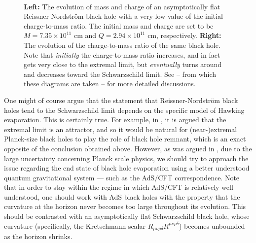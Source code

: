\documentclass[12pt]{article}
\newcommand{\2}{$^2$}
\newcommand{\3}{$^3$}
\newcommand{\4}{$_4$}
\newcommand{\5}{$_5$}
\begin{document}
\begin{figure}[!h]
\centering
\mbox{\quad
{}}
\caption{\textbf{Left:} The evolution of mass and charge of an asymptotically flat Reissner-Nordstr\"om black hole with a very low value of the initial charge-to-mass ratio. The initial mass and charge are set to be $M=7.35 \times 10^{11}$ cm and $Q=2.94 \times 10^{11}$ cm, respectively. \textbf{Right:} The evolution of the charge-to-mass ratio of the same black hole. Note that \emph{initially} the charge-to-mass ratio increases, and in fact gets very close to the extremal limit, but \emph{eventually} turns around and decreases toward the Schwarzschild limit. See \cite{OC} -- from which these diagrams are taken -- for more detailed discussions. \label{RNevol}}
\end{figure}


One might of course argue that the statement that Reissner-Nordstr\"om black holes tend to the Schwarzschild limit depends on the specific model of Hawking evaporation. This is certainly true. For example, in \cite{kn:kimwen}, it is argued that the extremal limit is an attractor, and so it would be natural for (near-)extremal Planck-size black holes to play the role of black hole remnant, which is an exact opposite of the conclusion obtained above. However, as was argued in \cite{OMC, OC}, due to the large uncertainty concerning Planck scale physics, we should try to approach the issue regarding the end state of black hole evaporation using a better understood quantum gravitational system --- such as the AdS/CFT correspondence. Note that in order to stay within the regime in which AdS/CFT is relatively well understood, one should work with AdS black holes with the property that the curvature at the horizon never becomes too large throughout its evolution. This should be contrasted with an asymptotically flat Schwarzschild black hole, whose curvature (specifically, the Kretschmann scalar $R_{\mu\nu\rho\delta}R^{\mu\nu\rho\delta}$) becomes unbounded as the horizon shrinks. 
\end{document}
